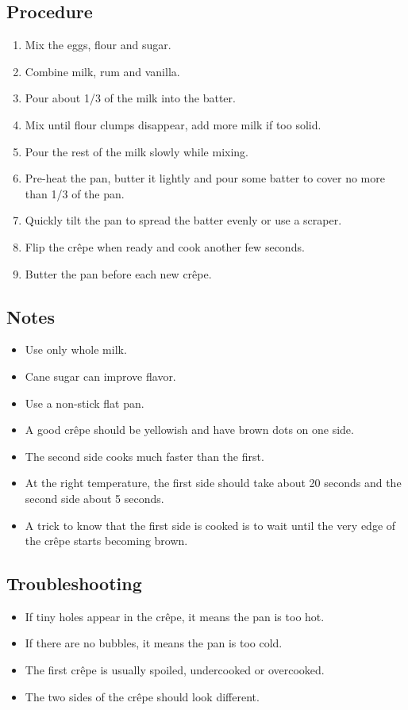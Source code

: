 \documentclass[10pt]{book}
\newcommand{\ecirc}{\^{e}}
\begin{document}
\subsection*{Procedure}
	\begin{enumerate}
		\item Mix the eggs, flour and sugar.
		\item Combine milk, rum and vanilla.
		\item Pour about 1/3 of the milk into the batter.
		\item Mix until flour clumps disappear, add more milk if too solid.
		\item Pour the rest of the milk slowly while mixing.
		\item Pre-heat the pan, butter it lightly and pour some batter to cover no more than 1/3 of the pan.
		\item Quickly tilt the pan to spread the batter evenly or use a scraper.
		\item Flip the cr{\ecirc}pe when ready and cook another few seconds.
		\item Butter the pan before each new cr{\ecirc}pe.
	\end{enumerate}
\subsection*{Notes}
	\begin{itemize}
		\item Use only whole milk.
		\item Cane sugar can improve flavor.
		\item Use a non-stick flat pan.
		\item A good cr{\ecirc}pe should be yellowish and have brown dots on one side.
		\item The second side cooks much faster than the first.
		\item At the right temperature, the first side should take about 20 seconds and the second side about 5 seconds.
		\item A trick to know that the first side is cooked is to wait until the very edge of the cr{\ecirc}pe starts becoming brown.
	\end{itemize}
\subsection*{Troubleshooting}
	\begin{itemize}
		\item If tiny holes appear in the cr{\ecirc}pe, it means the pan is too hot.
		\item If there are no bubbles, it means the pan is too cold.
		\item The first cr{\ecirc}pe is usually spoiled, undercooked or overcooked.
		\item The two sides of the cr{\ecirc}pe should look different.
	\end{itemize}
\newpage
\end{document}
